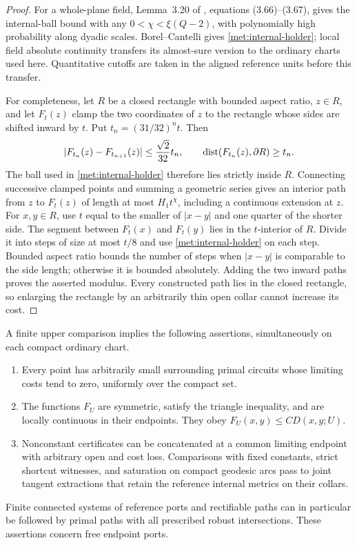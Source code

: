 \begin{proof}
For a whole-plane field, Lemma~3.20 of \cite{DubedatEtAlWeakMetric}, equations
(3.66)--(3.67), gives the internal-ball bound with any
$0<\chi<\xi(Q-2)$, with polynomially high probability along dyadic
scales.  Borel--Cantelli gives \eqref{met:internal-holder}; local field
absolute continuity transfers its almost-sure version to the ordinary
charts used here.  Quantitative cutoffs are taken in the aligned
reference units before this transfer.

For completeness, let $R$ be a closed rectangle with bounded aspect
ratio, $z\in R$, and let $F_t(z)$ clamp the two coordinates of $z$ to
the rectangle whose sides are shifted inward by $t$.  Put
$t_n=(31/32)^nt$.  Then
\[
 |F_{t_n}(z)-F_{t_{n+1}}(z)|\leq \frac{\sqrt2}{32}t_n,
 \qquad \operatorname{dist}(F_{t_n}(z),\partial R)\geq t_n.
\]
The ball used in \eqref{met:internal-holder} therefore lies strictly
inside $R$.  Connecting successive clamped points and summing a
geometric series gives an interior path from $z$ to $F_t(z)$ of length
at most $H_1t^\chi$, including a continuous extension at $z$.  For
$x,y\in R$, use $t$ equal to the smaller of $|x-y|$ and one quarter of
the shorter side.  The segment between $F_t(x)$ and $F_t(y)$ lies in the
$t$-interior of $R$.  Divide it into steps of size at most $t/8$ and use
\eqref{met:internal-holder} on each step.  Bounded aspect ratio bounds
the number of steps when $|x-y|$ is comparable to the side length;
otherwise it is bounded absolutely.  Adding the two inward paths
proves the asserted modulus.  Every constructed path lies in the
closed rectangle, so enlarging the rectangle by an arbitrarily thin
open collar cannot increase its cost.
\end{proof}

\begin{lemma}
\label{met:vanishing-joins}
A finite upper comparison implies the following assertions,
simultaneously on each compact ordinary chart.
\begin{enumerate}
\item Every point has arbitrarily small surrounding primal circuits
whose limiting costs tend to zero, uniformly over the compact set.
\item The functions $F_U$ are symmetric, satisfy the triangle
inequality, and are locally continuous in their endpoints.  They obey
$F_U(x,y)\leq C D(x,y;U)$.
\item Nonconstant certificates can be concatenated at a common
limiting endpoint with arbitrary open and cost loss.  Comparisons with
fixed constants, strict shortcut witnesses, and saturation on compact
geodesic arcs pass to joint tangent extractions that retain the
reference internal metrics on their collars.
\end{enumerate}
Finite connected systems of reference ports and rectifiable paths can
in particular be followed by primal paths with all prescribed robust
intersections.  These assertions concern free endpoint ports.
\end{lemma}

